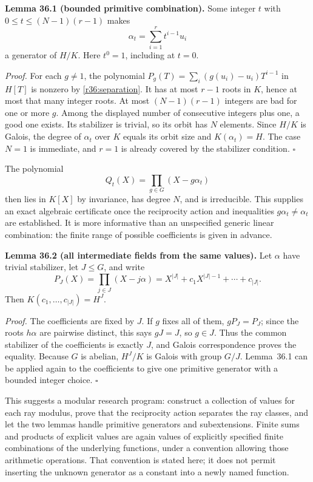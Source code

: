 \documentclass[11pt,a4paper]{article}
\numberwithin{equation}{section}
\begin{document}
\textbf{Lemma 36.1 (bounded primitive combination).}
Some integer $t$ with $0\le t\le(N-1)(r-1)$ makes
\[
 \alpha_t=\sum_{i=1}^r t^{i-1}u_i
\]
a generator of $H/K$. Here $t^0=1$, including at $t=0$.

\emph{Proof.}
For each $g\ne1$, the polynomial
$P_g(T)=\sum_i(g(u_i)-u_i)T^{i-1}$ in $H[T]$ is nonzero by
\eqref{r36:separation}. It has at most $r-1$ roots in $K$, hence at most that
many integer roots. At most $(N-1)(r-1)$ integers are bad for one or more
$g$. Among the displayed number of consecutive integers plus one, a good
one exists. Its stabilizer is trivial, so its orbit has $N$ elements. Since
$H/K$ is Galois, the degree of $\alpha_t$ over $K$ equals its orbit size and
$K(\alpha_t)=H$. The case $N=1$ is immediate, and $r=1$ is already covered
by the stabilizer condition. \hfill$\square$

The polynomial
\[
 Q_t(X)=\prod_{g\in G}(X-g\alpha_t)
\]
then lies in $K[X]$ by invariance, has degree $N$, and is irreducible. This
supplies an exact algebraic certificate once the reciprocity action and
inequalities $g\alpha_t\ne\alpha_t$ are established. It is more informative
than an unspecified generic linear combination: the finite range of possible
coefficients is given in advance.

\textbf{Lemma 36.2 (all intermediate fields from the same values).}
Let $\alpha$ have trivial stabilizer, let $J\le G$, and write
\[
 P_J(X)=\prod_{j\in J}(X-j\alpha)=X^{|J|}+c_1X^{|J|-1}+\cdots+c_{|J|}.
\]
Then $K(c_1,\ldots,c_{|J|})=H^J$.

\emph{Proof.}
The coefficients are fixed by $J$. If $g$ fixes all of them, $gP_J=P_J$;
since the roots $h\alpha$ are pairwise distinct, this says $gJ=J$, so
$g\in J$. Thus the common stabilizer of the coefficients is exactly $J$,
and Galois correspondence proves the equality. Because $G$ is abelian,
$H^J/K$ is Galois with group $G/J$. Lemma~36.1 can be applied again to the
coefficients to give one primitive generator with a bounded integer choice.
\hfill$\square$

This suggests a modular research program: construct a collection of values
for each ray modulus, prove that the reciprocity action separates the ray
classes, and let the two lemmas handle primitive generators and subextensions.
Finite sums and products of explicit values are again values of explicitly
specified finite combinations of the underlying functions, under a convention
allowing those arithmetic operations. That convention is stated here; it does
not permit inserting the unknown generator as a constant into a newly named
function.
\end{document}
